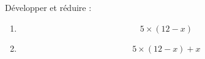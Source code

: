 
\begin{mental}
    Développer et réduire :
    \begin{enumerate}
        \item
            \begin{equation}
                5\times (12-x)
            \end{equation}
        \item
            \begin{equation}
                5\times (12-x)+x
            \end{equation}
    \end{enumerate}
\end{mental}
